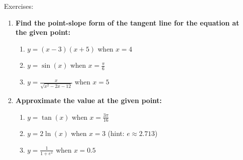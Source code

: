 \documentclass[../revisedmain.tex]{subfiles}
\begin{document}
\begin{center}
	\LARGE{Exercises:}
\end{center}
\begin{enumerate}
	\item \textbf{Find the point-slope form of the tangent line for the equation at the given point:}
	\begin{enumerate}
		\item $y=(x-3)(x+5)$ when $x=4$
		\item $y=\sin(x)$ when $x=\frac{\pi}{6}$
		\item $y=\displaystyle\frac{x}{\sqrt{x^2-2x-12}}$ when $x=5$ 
	\end{enumerate}
	\item \textbf{Approximate the value at the given point:}
	\begin{enumerate}
		\item $y=\tan(x)$ when $x=\displaystyle\frac{3\pi}{16}$
		\item $y=2\ln(x)$ when $x=3$ \qquad(hint: $e\approx2.713$)
		\item $y=\displaystyle\frac{1}{1+e^{x}}$ when $x=0.5$
	\end{enumerate}
\end{enumerate}
\end{document}
